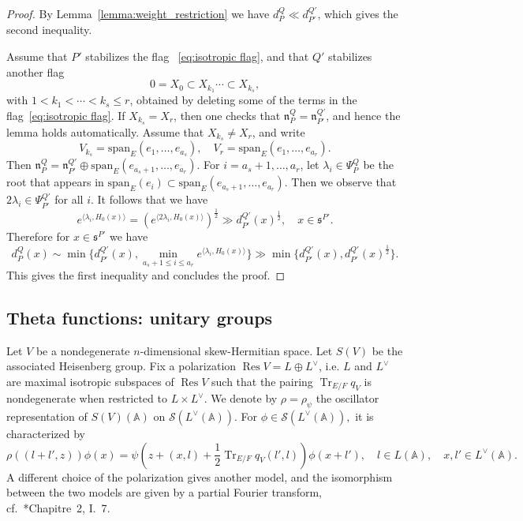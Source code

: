 \documentclass[letterpaper,11pt]{amsart}
\newcommand{\fn}{\mathfrak{n}}
\newcommand{\fs}{\mathfrak{s}}
\newcommand{\bA}{\mathbb{A}}
\newcommand{\cS}{\mathcal{S}}
\newcommand{\<}{\negthickspace}
\DeclareMathOperator{\Tr}{Tr}
\DeclareMathOperator{\Res}{Res}
\theoremstyle{definition}
\theoremstyle{plain}
\theoremstyle{remark}
\numberwithin{equation}{section}
\begin{document}
\begin{proof}
By Lemma~\ref{lemma:weight_restriction} we have
$d_{P}^{Q} \ll d_{P'}^{Q'}$, which gives the second inequality.

Assume that $P'$ stabilizes the flag ~\eqref{eq:isotropic flag}, and
that $Q'$ stabilizes another flag
   \[
        0 = X_0 \subset X_{k_1} \cdots \subset X_{k_s},
    \]
    with $1 < k_1 < \cdots < k_s \le r$, obtained by deleting some of the terms in the
flag~\eqref{eq:isotropic flag}. If $X_{k_s} = X_r$,
then one checks that $\fn_P^Q = \fn_{P'}^{Q'}$, and hence the
lemma holds automatically. Assume that $X_{k_s} \not= X_r$, and write
    \[
    V_{k_s} = \mathrm{span}_E(e_1, \hdots, e_{a_s}), \quad
    V_r = \mathrm{span}_E(e_1, \hdots, e_{a_r}).
    \]
Then $\fn_P^Q = \fn_{P'}^{Q'} \oplus
\mathrm{span}_E(e_{a_{s}+1}, \hdots, e_{a_r})$.
For $i = a_{s}+1, \hdots, a_r$, let $\lambda_i \in \Psi_P^Q$
be the root that appears in  $\mathrm{span}_E(e_i) \subset
\mathrm{span}_E(e_{a_{s}+1}, \hdots, e_{a_r})$. Then
we observe that $2 \lambda_i \in \Psi_{P'}^{Q'}$ for all $i$.
It follows that we have
        \[
        e^{\langle \lambda_i, H_0(x) \rangle} =
        \left( e^{\langle 2 \lambda_i,H_0(x) \rangle} \right)^{\frac 12}
        \gg d_{P'}^{Q'}(x)^{\frac 12}, \quad
        x \in \fs^{P'}.
        \]
Therefore for $x \in \fs^{P'}$ we have
        \[
        d_{P}^{Q}(x) \sim
        \min \{ d_{P'}^{Q'}(x), \min_{a_{s}+1 \leq i \le a_r}
        e^{\langle \lambda_i, H_0(x) \rangle} \}
        \gg \min \{d_{P'}^{Q'}(x),d_{P'}^{Q'}(x)^{\frac 12} \}.
        \]
This gives the first inequality and concludes the proof.
\end{proof}

\subsection{Theta functions: unitary groups}  \label{subsec:theta_series_U}
Let $V$ be a nondegenerate $n$-dimensional skew-Hermitian space. Let $S(V)$ be the associated Heisenberg group. Fix a polarization $\Res V = L \oplus L^\vee$,
i.e. $L$ and $L^\vee$ are maximal isotropic subspaces of $\Res V$ such that the
pairing $\Tr_{E/F} q_V$ is nondegenerate when restricted to $L \times L^\vee$. We
denote by $\rho = \rho_{\psi}$ the oscillator representation of $S(V)(\bA)$
on $\cS(L^\vee(\bA))$. For $\phi \in \cS(L^\vee(\bA)),$ it is characterized by
    \begin{equation}    \label{eq:oscillating}
    \rho((l+l', z))\phi(x) =
    \psi\left( z + (x, l) + \frac{1}{2} \Tr_{E/F} q_V(l', l) \right)
    \phi(x+l'), \quad l \in L(\bA), \quad x, l' \in L^\vee(\bA).
    \end{equation}
A different choice of the polarization gives another model, and the isomorphism
between the two models are given by a partial Fourier transform,
cf.~\cite{MVW}*{Chapitre~2, I.~7}.
\end{document}
